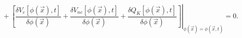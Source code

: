 \begin{equation}
\hspace{4cm}+\left.  \left[  \frac{\delta V_{c}\left[  \phi(\vec{x}),t\right]
}{\delta\phi(\vec{x})}+\frac{\delta V_{nc}\left[  \phi(\vec{x}),t\right]
}{\delta\phi(\vec{x})}+\frac{\delta Q_{K}\left[  \phi(\vec{x}),t\right]
}{\delta\phi(\vec{x})}\right]  \right|  _{\phi(\vec{x})=\phi(\vec{x}%
,t)}=0.\label{9}%
\end{equation}


